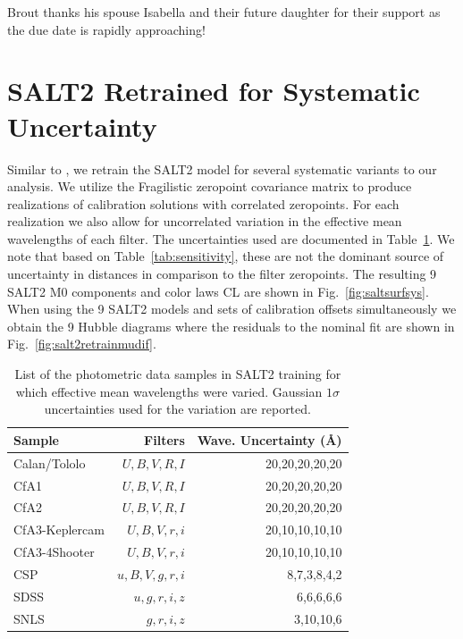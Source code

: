 \documentclass[twocolumn]{aastex63}
\begin{document}
 Brout thanks his spouse Isabella and their future daughter for their support as the due date is rapidly approaching!

\appendix

\section{SALT2 Retrained for Systematic Uncertainty}



Similar to \cite{Betoule2014}, we retrain the SALT2 model for several systematic variants to our analysis. We utilize the Fragilistic zeropoint covariance matrix to produce realizations of calibration solutions with correlated zeropoints. For each realization we also allow for uncorrelated variation in the effective mean wavelengths of each filter. The uncertainties used are documented in Table~\ref{tab:wavunc}. We note that based on Table~\ref{tab:sensitivity}, these are not the dominant source of uncertainty in distances in comparison to the filter zeropoints. The resulting 9 SALT2 M0 components and color laws CL are shown in Fig.~\ref{fig:saltsurfsys}. When using the 9 SALT2 models and sets of calibration offsets simultaneously we obtain the 9 Hubble diagrams where the residuals to the nominal fit are shown in Fig.~\ref{fig:salt2retrainmudif}.



    
    
\begin{table}
\centering
\begin{tabular}{l|rr}
\toprule
Sample & Filters & Wave. Uncertainty (\AA) \\
\hline
Calan/Tololo  & $U,B,V,R,I$ &  20,20,20,20,20 \\
CfA1  & $U,B,V,R,I$ &  20,20,20,20,20 \\
CfA2  & $U,B,V,R,I$ & 20,20,20,20,20 \\
CfA3-Keplercam  & $U,B,V,r,i$ & 20,10,10,10,10\\
CfA3-4Shooter  &$U,B,V,r,i$ &  20,10,10,10,10  \\
CSP  &$u,B,V,g,r,i$ &  8,7,3,8,4,2  \\
SDSS  &  $u,g,r,i,z$ & 6,6,6,6,6\\
SNLS  &  $g,r,i,z$ &  3,10,10,6\\
\end{tabular}
\caption{List of the photometric data samples in SALT2 training for which effective mean wavelengths were varied. Gaussian $1\sigma$ uncertainties used for the variation are reported.
}
\label{tab:wavunc}
\end{table}
\end{document}

